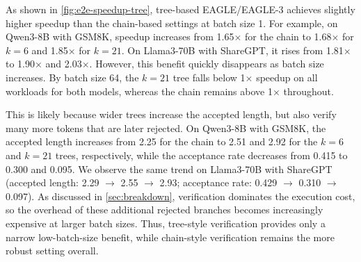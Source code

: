 \documentclass{article}
\begin{document}
As shown in \autoref{fig:e2e-speedup-tree}, tree-based EAGLE/EAGLE-3 achieves slightly higher speedup than the chain-based settings at batch size 1. For example, on Qwen3-8B with GSM8K, speedup increases from 1.65$\times$ for the chain to 1.68$\times$ for $k{=}6$ and 1.85$\times$ for $k{=}21$. On Llama3-70B with ShareGPT, it rises from 1.81$\times$ to 1.90$\times$ and 2.03$\times$. However, this benefit quickly disappears as batch size increases. By batch size 64, the $k{=}21$ tree falls below 1$\times$ speedup on all workloads for both models, whereas the chain remains above 1$\times$ throughout.

This is likely because wider trees increase the accepted length, but also verify many more tokens that are later rejected. On Qwen3-8B with GSM8K, the accepted length increases from 2.25 for the chain to 2.51 and 2.92 for the $k{=}6$ and $k{=}21$ trees, respectively, while the acceptance rate decreases from 0.415 to 0.300 and 0.095. We observe the same trend on Llama3-70B with ShareGPT (accepted length: 2.29 $\rightarrow$ 2.55 $\rightarrow$ 2.93; acceptance rate: 0.429 $\rightarrow$ 0.310 $\rightarrow$ 0.097). As discussed in \autoref{sec:breakdown}, verification dominates the execution cost, so the overhead of these additional rejected branches becomes increasingly expensive at larger batch sizes. Thus, tree-style verification provides only a narrow low-batch-size benefit, while chain-style verification remains the more robust setting overall.
\end{document}
